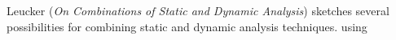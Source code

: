 

Leucker
\cite{isola-2016-leucker}
({\em On Combinations of Static and Dynamic Analysis})
sketches several possibilities for combining static and dynamic
analysis techniques.  using
